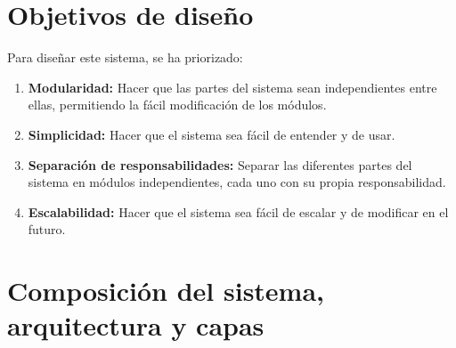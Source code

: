 \documentclass[a4paper,12pt]{article}
\begin{document}



    \printbibliography


    \section{Objetivos de diseño}\label{sec:objetivos-de-diseno}
    Para diseñar este sistema, se ha priorizado:
    \begin{enumerate}
        \item \textbf{Modularidad:} Hacer que las partes del sistema sean independientes entre ellas, permitiendo la fácil modificación de los módulos.
        \item \textbf{Simplicidad:} Hacer que el sistema sea fácil de entender y de usar.
        \item \textbf{Separación de responsabilidades:} Separar las diferentes partes del sistema en módulos independientes, cada uno con su propia responsabilidad.
        \item \textbf{Escalabilidad:} Hacer que el sistema sea fácil de escalar y de modificar en el futuro.
    \end{enumerate}


    \section{Composición del sistema, arquitectura y capas}\label{sec:composicion-del-sistema-arquitectura-y-capas}
    
\end{document}

